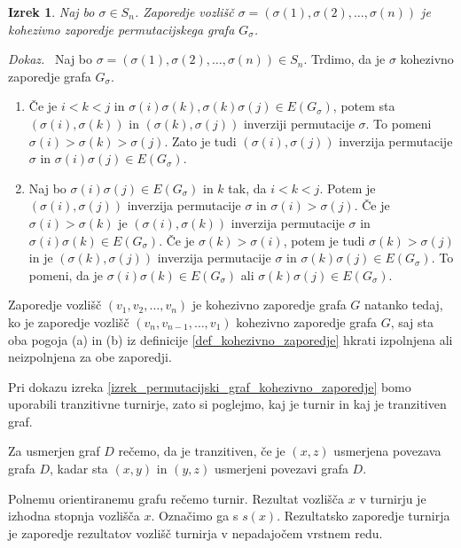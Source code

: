 \documentclass[a4paper, 12pt]{book}
\newtheorem{izrek}{Izrek}[chapter]
\newenvironment{dokaz}{\emph{Dokaz.}\ }{\hspace{\fill}{$\Box$}}
\begin{document}
\begin{izrek}
\label{izrek_sigma_kohezivno_zaporedje}
    Naj bo $\sigma \in S_n$. Zaporedje vozlišč $\sigma = (\sigma(1), \sigma(2), \dots, \sigma(n))$ je kohezivno zaporedje permutacijskega grafa $G_{\sigma}$.
\end{izrek}
\begin{dokaz}
    Naj bo $\sigma = (\sigma(1), \sigma(2), \dots, \sigma(n)) \in S_n$. Trdimo, da je $\sigma$ kohezivno zaporedje grafa $G_{\sigma}$. 
    \begin{enumerate}[label=(\alph*)]
        \item Če je $i < k < j$ in $\sigma(i)\sigma(k), \sigma(k)\sigma(j) \in E(G_{\sigma})$, potem sta $(\sigma(i),\sigma(k))$ in $(\sigma(k),\sigma(j))$ inverziji permutacije $\sigma$. To pomeni $\sigma(i) > \sigma(k) > \sigma(j)$. Zato je tudi $(\sigma(i),\sigma(j))$ inverzija permutacije $\sigma$ in $\sigma(i)\sigma(j) \in E(G_{\sigma})$.        

        \item Naj bo $\sigma(i)\sigma(j) \in E(G_{\sigma})$ in $k$ tak, da $i < k < j$. Potem je $(\sigma(i),\sigma(j))$ inverzija permutacije $\sigma$ in $\sigma(i) > \sigma(j)$. Če je $\sigma(i) > \sigma(k)$ je $(\sigma(i),\sigma(k))$ inverzija permutacije $\sigma$ in $\sigma(i)\sigma(k) \in E(G_{\sigma})$. Če je $\sigma(k) > \sigma(i)$, potem je tudi $\sigma(k) > \sigma(j)$ in je $(\sigma(k), \sigma(j))$ inverzija permutacije $\sigma$ in $\sigma(k)\sigma(j) \in E(G_{\sigma})$. To pomeni, da je 
        $\sigma(i)\sigma(k) \in E(G_{\sigma})$ ali $\sigma(k)\sigma(j) \in E(G_{\sigma})$.
    \end{enumerate}
\end{dokaz}

Zaporedje vozlišč $(v_1, v_2, \dots, v_n)$ je kohezivno zaporedje grafa $G$ natanko tedaj, ko je zaporedje vozlišč $(v_n, v_{n-1}, \dots, v_1)$ kohezivno zaporedje grafa $G$, saj sta oba pogoja (a) in (b) iz definicije \ref{def_kohezivno_zaporedje} hkrati izpolnjena ali neizpolnjena za obe zaporedji.

Pri dokazu izreka \ref{izrek_permutacijski_graf_kohezivno_zaporedje} bomo uporabili tranzitivne turnirje, zato si poglejmo, kaj je turnir in kaj je tranzitiven graf.

Za usmerjen graf $D$ rečemo, da je tranzitiven, če je $(x, z)$ usmerjena povezava grafa $D$, kadar sta $(x, y)$ in $(y, z)$ usmerjeni povezavi grafa $D$. 

Polnemu orientiranemu grafu rečemo turnir. Rezultat vozlišča $x$ v turnirju je izhodna stopnja vozlišča $x$. Označimo ga s $s(x)$. Rezultatsko zaporedje turnirja je zaporedje rezultatov vozlišč turnirja v nepadajočem vrstnem redu.
\end{document}
